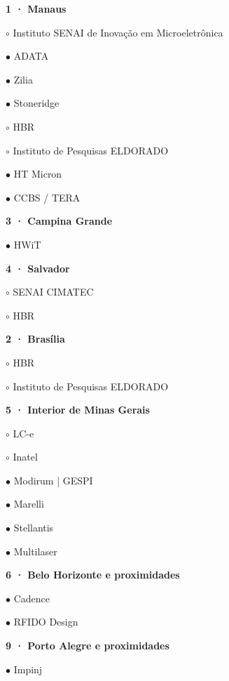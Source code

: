 \documentclass[10pt,a3paper]{article}
\begin{document}
\begin{minipage}[t]{.28\linewidth}\vspace{0pt}\small\raggedright
\textcolor{azul}{\textbf{1 · Manaus}}\par
$\circ$ Instituto SENAI de Inovação em Microeletrônica\par
$\bullet$ ADATA\par
$\bullet$ Zilia\par
$\bullet$ Stoneridge\par
$\circ$ HBR\par
$\circ$ Instituto de Pesquisas ELDORADO\par
$\bullet$ HT Micron\par
$\bullet$ CCBS / TERA\par
\vspace{2mm}
\textcolor{azul}{\textbf{3 · Campina Grande}}\par
$\bullet$ HWiT\par
\vspace{2mm}
\textcolor{azul}{\textbf{4 · Salvador}}\par
$\circ$ SENAI CIMATEC\par
$\circ$ HBR\par
\vspace{2mm}
\textcolor{azul}{\textbf{2 · Brasília}}\par
$\circ$ HBR\par
$\circ$ Instituto de Pesquisas ELDORADO\par
\vspace{2mm}
\textcolor{azul}{\textbf{5 · Interior de Minas Gerais}}\par
$\circ$ LC-e\par
$\circ$ Inatel\par
$\bullet$ Modirum | GESPI\par
$\bullet$ Marelli\par
$\bullet$ Stellantis\par
$\bullet$ Multilaser\par
\vspace{2mm}
\textcolor{azul}{\textbf{6 · Belo Horizonte e proximidades}}\par
$\bullet$ Cadence\par
$\bullet$ RFIDO Design\par
\vspace{2mm}
\textcolor{azul}{\textbf{9 · Porto Alegre e proximidades}}\par
$\bullet$ Impinj\par

\end{minipage}
\end{document}

